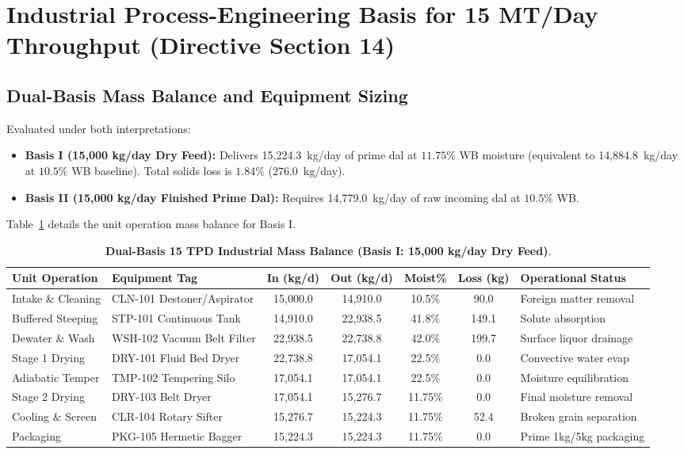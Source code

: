 \documentclass[10pt,a4paper]{article}
\begin{document}
\section{Industrial Process-Engineering Basis for 15 MT/Day Throughput (Directive Section 14)}

\subsection{Dual-Basis Mass Balance and Equipment Sizing}
Evaluated under both interpretations:
\begin{itemize}
    \item \textbf{Basis I (15,000 kg/day Dry Feed):} Delivers 15,224.3~kg/day of prime dal at $11.75\%$ WB moisture (equivalent to 14,884.8~kg/day at $10.5\%$ WB baseline). Total solids loss is $1.84\%$ ($276.0$~kg/day).
    \item \textbf{Basis II (15,000 kg/day Finished Prime Dal):} Requires 14,779.0~kg/day of raw incoming dal at $10.5\%$ WB.
\end{itemize}
Table~\ref{tab:mass_balance} details the unit operation mass balance for Basis I.

\begin{table}[H]
\centering
\footnotesize
\setlength{\tabcolsep}{3.5pt}
\caption{\textbf{Dual-Basis 15 TPD Industrial Mass Balance (Basis I: 15,000 kg/day Dry Feed)}.}
\label{tab:mass_balance}
\begin{tabularx}{\linewidth}{p{2.8cm}p{3.5cm}cccc>{\raggedright\arraybackslash}X}
\toprule
\textbf{Unit Operation} & \textbf{Equipment Tag} & \textbf{In (kg/d)} & \textbf{Out (kg/d)} & \textbf{Moist\%} & \textbf{Loss (kg)} & \textbf{Operational Status} \\
\midrule
Intake \& Cleaning & CLN-101 Destoner/Aspirator & 15,000.0 & 14,910.0 & 10.5\% & 90.0 & Foreign matter removal \\
Buffered Steeping  & STP-101 Continuous Tank   & 14,910.0 & 22,938.5 & 41.8\% & 149.1 & Solute absorption \\
Dewater \& Wash    & WSH-102 Vacuum Belt Filter & 22,938.5 & 22,738.8 & 42.0\% & 199.7 & Surface liquor drainage \\
Stage 1 Drying     & DRY-101 Fluid Bed Dryer    & 22,738.8 & 17,054.1 & 22.5\% & 0.0 & Convective water evap \\
Adiabatic Temper   & TMP-102 Tempering Silo     & 17,054.1 & 17,054.1 & 22.5\% & 0.0 & Moisture equilibration \\
Stage 2 Drying     & DRY-103 Belt Dryer         & 17,054.1 & 15,276.7 & 11.75\% & 0.0 & Final moisture removal \\
Cooling \& Screen  & CLR-104 Rotary Sifter      & 15,276.7 & 15,224.3 & 11.75\% & 52.4 & Broken grain separation \\
Packaging          & PKG-105 Hermetic Bagger    & 15,224.3 & 15,224.3 & 11.75\% & 0.0 & Prime 1kg/5kg packaging \\
\bottomrule
\end{tabularx}
\end{table}
\end{document}
